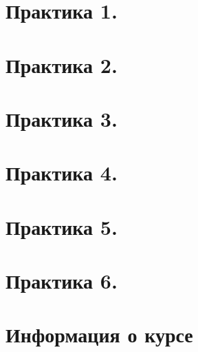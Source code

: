 \maketitle
\tableofcontents


\newpage
\section{Практика 1.}

\newpage
\section{Практика 2.}

\newpage
\section{Практика 3.}

\newpage
\section{Практика 4.}

\newpage
\section{Практика 5.}

\newpage
\section{Практика 6.}

\newpage
\section{Информация о курсе}
